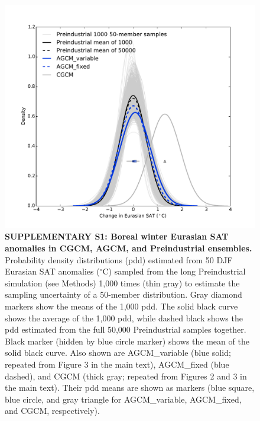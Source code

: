 \documentclass{nature}
\begin{document}
\begin{figure}%
\centering
\noindent\includegraphics[width=29pc]{Word/SuppFigure_1_PIuncertainty.pdf}
\caption{\textbf{SUPPLEMENTARY S1: Boreal winter Eurasian SAT anomalies in CGCM, AGCM, and Preindustrial ensembles.} Probability density distributions (pdd) estimated from 50 DJF Eurasian SAT anomalies ($^\circ$C) sampled from the long Preindustrial simulation (see Methods) 1,000 times (thin gray) to estimate the sampling uncertainty of a 50-member distribution. Gray diamond markers show the means of the 1,000 pdd. The solid black curve shows the average of the 1,000 pdd, while dashed black shows the pdd estimated from the full 50,000 Preindustrial samples together. Black marker (hidden by blue circle marker) shows the mean of the solid black curve. Also shown are AGCM\_variable (blue solid; repeated from Figure 3 in the main text), AGCM\_fixed (blue dashed), and CGCM (thick gray; repeated from Figures 2 and 3 in the main text). Their pdd means are shown as markers (blue square, blue circle, and gray triangle for AGCM\_variable, AGCM\_fixed, and CGCM, respectively).
}
\label{fig:supp1} 
\end{figure}
\end{document}
